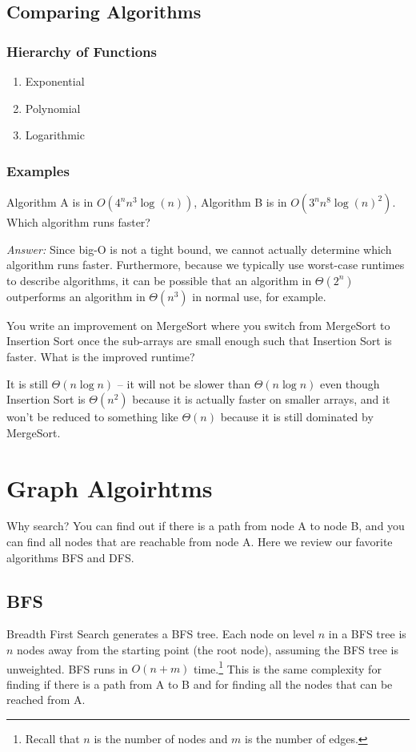 \documentclass[11pt]{article}
\begin{document}
\subsection{Comparing Algorithms}
\subsubsection{Hierarchy of Functions}
\begin{enumerate}
    \item Exponential
    \item Polynomial
    \item Logarithmic
\end{enumerate}
\subsubsection{Examples}
\begin{exmp}
Algorithm A is in $O(4^nn^3\log(n))$, Algorithm B is in $O(3^nn^8\log(n)^2)$. Which algorithm runs faster?
\end{exmp} 
\textit{Answer:} Since big-O is not a tight bound, we cannot actually determine which algorithm runs faster. Furthermore, because we typically use worst-case runtimes to describe algorithms, it can be possible that an algorithm in $\Theta(2^n)$ outperforms an algorithm in $\Theta(n^3)$ in normal use, for example.

\begin{exmp}
You write an improvement on MergeSort where you switch from MergeSort to Insertion Sort once the sub-arrays are small enough such that Insertion Sort is faster. What is the improved runtime?
\end{exmp}
It is still $\Theta(n \log n)$ -- it will not be slower than $\Theta(n \log n)$ even though Insertion Sort is $\Theta(n^2)$ because it is actually faster on smaller arrays, and it won't be reduced to something like $\Theta(n)$ because it is still dominated by MergeSort.

\section{Graph Algoirhtms}
\begin{tcolorbox}
Why search? You can find out if there is a path from node A to node B, and you can find all nodes that are reachable from node A. Here we review our favorite algorithms BFS and DFS.
\end{tcolorbox}
\subsection{BFS}
Breadth First Search generates a BFS tree. Each node on level $n$ in a BFS tree is $n$ nodes away from the starting point (the root node), assuming the BFS tree is unweighted. BFS runs in $O(n+m)$ time.\footnote{Recall that $n$ is the number of nodes and $m$ is the number of edges.} This is the same complexity for finding if there is a path from A to B and for finding all the nodes that can be reached from A.
\end{document}
